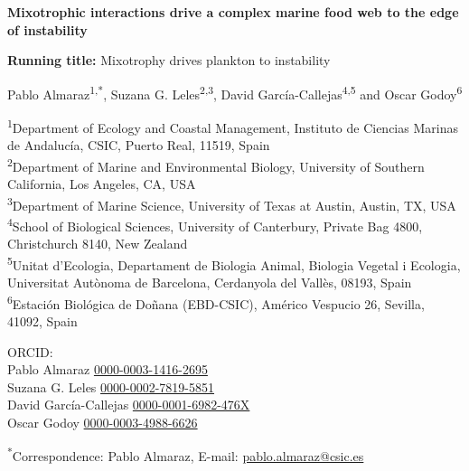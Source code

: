 \documentclass[12pt]{article}
\begin{document}
\thispagestyle{empty}
\begin{flushleft}

{\Large\bfseries Mixotrophic interactions drive a complex marine food web to the edge of instability}

\vspace{1.5em}
\textbf{Running title:} Mixotrophy drives plankton to instability

\vspace{1.5em}
Pablo Almaraz\textsuperscript{1,*}, Suzana G. Leles\textsuperscript{2,3}, David Garc\'{i}a-Callejas\textsuperscript{4,5} and Oscar Godoy\textsuperscript{6}

\vspace{1em}
\textsuperscript{1}Department of Ecology and Coastal Management, Instituto de Ciencias Marinas de Andaluc\'{i}a, CSIC, Puerto Real, 11519, Spain \\
\textsuperscript{2}Department of Marine and Environmental Biology, University of Southern California, Los Angeles, CA, USA \\
\textsuperscript{3}Department of Marine Science, University of Texas at Austin, Austin, TX, USA \\
\textsuperscript{4}School of Biological Sciences, University of Canterbury, Private Bag 4800, Christchurch 8140, New Zealand \\
\textsuperscript{5}Unitat d'Ecologia, Departament de Biologia Animal, Biologia Vegetal i Ecologia, Universitat Aut\`{o}noma de Barcelona, Cerdanyola del Vall\`{e}s, 08193, Spain \\
\textsuperscript{6}Estaci\'{o}n Biol\'{o}gica de Do\~{n}ana (EBD-CSIC), Am\'{e}rico Vespucio 26, Sevilla, 41092, Spain

\vspace{1em}
ORCID: \\
Pablo Almaraz \href{https://orcid.org/0000-0003-1416-2695}{0000-0003-1416-2695} \\
Suzana G. Leles \href{https://orcid.org/0000-0002-7819-5851}{0000-0002-7819-5851} \\
David Garc\'{i}a-Callejas \href{https://orcid.org/0000-0001-6982-476X}{0000-0001-6982-476X} \\
Oscar Godoy \href{https://orcid.org/0000-0003-4988-6626}{0000-0003-4988-6626}

\vspace{1em}
\textsuperscript{*}Correspondence: Pablo Almaraz, E-mail: \href{mailto:pablo.almaraz@csic.es}{pablo.almaraz@csic.es}


\end{flushleft}
\end{document}
